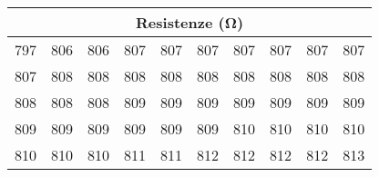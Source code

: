 \begin{tabular}{cccccccccc}
    \hline
    \multicolumn{10}{c}{Resistenze (\unit{\ohm})}\\\hline\hline
    797 & 806 & 806 & 807 & 807 & 807 & 807 & 807 & 807 & 807 \\
    807 & 808 & 808 & 808 & 808 & 808 & 808 & 808 & 808 & 808 \\
    808 & 808 & 808 & 809 & 809 & 809 & 809 & 809 & 809 & 809 \\
    809 & 809 & 809 & 809 & 809 & 809 & 810 & 810 & 810 & 810 \\
    810 & 810 & 810 & 811 & 811 & 812 & 812 & 812 & 812 & 813 \\ \hline
\end{tabular}